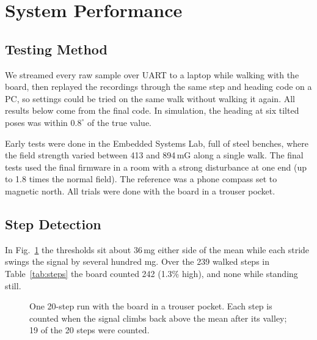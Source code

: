 \documentclass[conference,a4paper]{IEEEtran}
\begin{document}
\section{System Performance}
\subsection{Testing Method}
We streamed every raw sample over UART to a laptop while walking with the board, then replayed
the recordings through the same step and heading code on a PC, so settings could be tried on
the same walk without walking it again. All results below come from the final code. In
simulation, the heading at six tilted poses was within $0.8^\circ$ of the true value.

Early tests were done in the Embedded Systems Lab, full of steel benches, where the field strength
varied between 413 and 894\,mG along a single walk. The final tests used the final firmware in a
room with a strong disturbance at one end (up to 1.8 times the normal field). The reference was
a phone compass set to magnetic north. All trials were done with the board in a trouser pocket.

\subsection{Step Detection}
In Fig.~\ref{fig:steps} the thresholds sit about 36\,mg either side of the mean while each
stride swings the signal by several hundred mg. Over the 239 walked steps in
Table~\ref{tab:steps} the board counted 242 (1.3\% high), and none while standing still.

\begin{figure}[!h]
\centering
{}
\caption{One 20-step run with the board in a trouser pocket. Each step is counted when the
signal climbs back above the mean after its valley; 19 of the 20 steps were counted.}
\label{fig:steps}
\end{figure}
\end{document}
